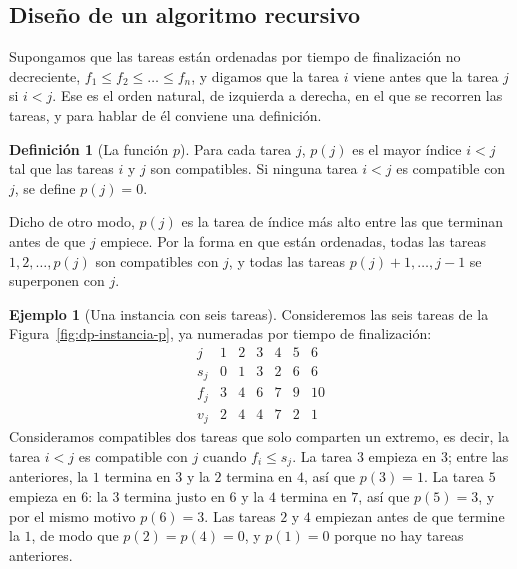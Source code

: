 \documentclass[12pt, spanish, oneside, openany]{book}
\theoremstyle{uprightplain}
\theoremstyle{definition}
\newtheorem{definicion}[teorema]{Definición}
\newtheorem{ejemplo}[teorema]{Ejemplo}
\theoremstyle{remark}
\theoremstyle{definition}
\begin{document}
\subsection{Diseño de un algoritmo recursivo}

Supongamos que las tareas están ordenadas por tiempo de finalización no decreciente, $f_1\le f_2\le\dots\le f_n$, y digamos que la tarea $i$ viene antes que la tarea $j$ si $i<j$. Ese es el orden natural, de izquierda a derecha, en el que se recorren las tareas, y para hablar de él conviene una definición.

\begin{definicion}[La función $p$]
\label{def:dp-p}
Para cada tarea $j$, $p(j)$ es el mayor índice $i<j$ tal que las tareas $i$ y $j$ son compatibles. Si ninguna tarea $i<j$ es compatible con $j$, se define $p(j)=0$.
\end{definicion}

Dicho de otro modo, $p(j)$ es la tarea de índice más alto entre las que terminan antes de que $j$ empiece. Por la forma en que están ordenadas, todas las tareas $1,2,\dots,p(j)$ son compatibles con $j$, y todas las tareas $p(j)+1,\dots,j-1$ se superponen con $j$.

\begin{ejemplo}[Una instancia con seis tareas]
\label{ej:dp-intervalos}
Consideremos las seis tareas de la Figura~\ref{fig:dp-instancia-p}, ya numeradas por tiempo de finalización:
\[
\begin{array}{c|cccccc}
j & 1 & 2 & 3 & 4 & 5 & 6\\\hline
s_j & 0 & 1 & 3 & 2 & 6 & 6\\
f_j & 3 & 4 & 6 & 7 & 9 & 10\\
v_j & 2 & 4 & 4 & 7 & 2 & 1
\end{array}
\]
Consideramos compatibles dos tareas que solo comparten un extremo, es decir, la tarea $i<j$ es compatible con $j$ cuando $f_i\le s_j$. La tarea $3$ empieza en $3$; entre las anteriores, la $1$ termina en $3$ y la $2$ termina en $4$, así que $p(3)=1$. La tarea $5$ empieza en $6$: la $3$ termina justo en $6$ y la $4$ termina en $7$, así que $p(5)=3$, y por el mismo motivo $p(6)=3$. Las tareas $2$ y $4$ empiezan antes de que termine la $1$, de modo que $p(2)=p(4)=0$, y $p(1)=0$ porque no hay tareas anteriores.
\end{ejemplo}
\end{document}
